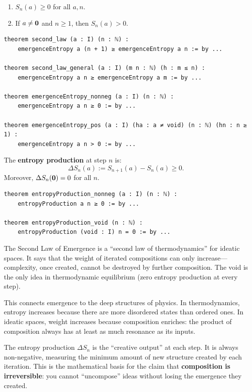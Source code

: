 \begin{theorem}
\label{thm:entropy-positive}
\begin{enumerate}
  \item $S_n(a) \geq 0$ for all $a, n$.
  \item If $a \neq \mathbf{0}$ and $n \geq 1$, then $S_n(a) > 0$.
\end{enumerate}
\end{theorem}

\begin{lstlisting}[caption={Emergence entropy (IDT\_v3\_Emergence.lean)}]
theorem second_law (a : I) (n : ℕ) :
    emergenceEntropy a (n + 1) ≥ emergenceEntropy a n := by ...

theorem second_law_general (a : I) (m n : ℕ) (h : m ≤ n) :
    emergenceEntropy a n ≥ emergenceEntropy a m := by ...

theorem emergenceEntropy_nonneg (a : I) (n : ℕ) :
    emergenceEntropy a n ≥ 0 := by ...

theorem emergenceEntropy_pos (a : I) (ha : a ≠ void) (n : ℕ) (hn : n ≥ 1) :
    emergenceEntropy a n > 0 := by ...
\end{lstlisting}

\begin{theorem}
\label{thm:entropy-production}
The \textbf{entropy production} at step $n$ is:
\[
  \Delta S_n(a) := S_{n+1}(a) - S_n(a) \geq 0.
\]
Moreover, $\Delta S_n(\mathbf{0}) = 0$ for all $n$.
\end{theorem}

\begin{lstlisting}[caption={Entropy production (IDT\_v3\_Emergence.lean)}]
theorem entropyProduction_nonneg (a : I) (n : ℕ) :
    entropyProduction a n ≥ 0 := by ...

theorem entropyProduction_void (n : ℕ) :
    entropyProduction (void : I) n = 0 := by ...
\end{lstlisting}

\begin{interpretation}
The Second Law of Emergence is a ``second law of thermodynamics'' for ideatic
spaces. It says that the weight of iterated compositions can only increase---complexity,
once created, cannot be destroyed by further composition. The void is the only
idea in thermodynamic equilibrium (zero entropy production at every step).

This connects emergence to the deep structures of physics. In thermodynamics,
entropy increases because there are more disordered states than ordered ones.
In ideatic spaces, weight increases because composition enriches: the product
of composition always has at least as much resonance as its inputs.

The entropy production $\Delta S_n$ is the ``creative output'' at each step.
It is always non-negative, measuring the minimum amount of new structure created
by each iteration. This is the mathematical basis for the claim that
\textbf{composition is irreversible}: you cannot ``uncompose'' ideas without
losing the emergence they created.
\end{interpretation}


